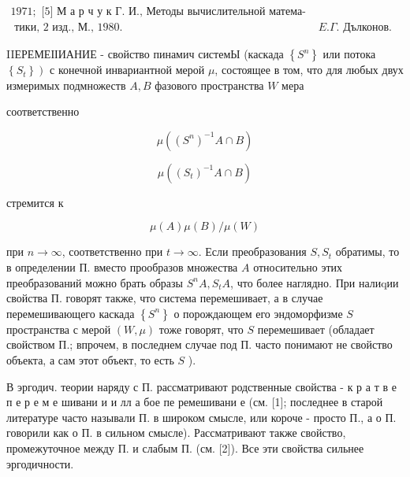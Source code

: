 \documentclass[10pt]{article}
\begin{document}
$\begin{array}{rrr}1971 ; \text { [5] М а р ч у к Г. И., Методы вычислительной матема- } \\ \text { тики, 2 изд., М., } 1980 . & E . \Gamma . \text { Дълконов. }\end{array}$



IIЕРЕМЕІІИАНИЕ - свойство пинамич системЫ (каскада $\left\{S^{n}\right\}$ или потока $\left.\left\{S_{t}\right\}\right)$ с конечной инвариантной мерой $\mu$, состоящее в том, что для любых двух измеримых подмножеств $A, B$ фазового пространства $W$ мера



соответственно



\[

\mu\left(\left(S^{n}\right)^{-1} A \cap B\right)

\]



\[

\mu\left(\left(S_{t}\right)^{-1} A \cap B\right)

\]



стремится к



\[

\mu(A) \mu(B) / \mu(W)

\]



при $n \rightarrow \infty$, соответственно при $t \rightarrow \infty$. Если преобразования $S, S_{t}$ обратимы, то в определении П. вместо прообразов множества $A$ относительно этих преобразований можно брать образы $S^{n} A, S_{t} A$, что более наглядно. При налиqии свойства П. говорят также, что система перемешивает, а в случае перемешивающего каскада $\left\{S^{n}\right\}$ о порождающем его эндоморфизме $S$ пространства с мерой $(W, \mu)$ тоже говорят, что $S$ перемешивает (обладает свойством П.; впрочем, в последнем случае под П. часто понимают не свойство объекта, а сам этот объект, то есть $S$ ).



В эргодич. теории наряду с П. рассматривают родственные свойства - к р а т в е п е р е м е шивани и и лл а бое пе ремешивани е (см. [1]; последнее в старой литературе часто называли П. в широком смысле, или короче - просто П., а о П. говорили как о П. в сильном смысле). Рассматривают также свойство, промежуточное между П. и слабым П. (см. [2]). Все эти свойства сильнее эргодичности.
\end{document}
